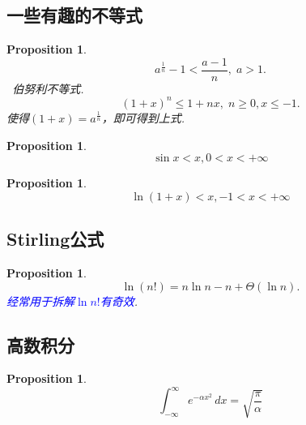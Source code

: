 \documentclass{article}
\newtheorem{proposition}[theorem]{Proposition}
\newcommand{\hints}{{\color{blue} \text{hints}}}
\newcommand{\bluet}[1]{\textcolor{blue}{#1}}
\begin{document}
\subsection{一些有趣的不等式}

\begin{proposition}\label{prop: bonuli}
$$
a^{\frac{1}{n}}-1 < \frac{a-1}{n},\; a > 1.
$$
\hints\ {\color{red}伯努利不等式}.
$$
(1+x)^n \leq 1 + nx, \; n \geq 0, x \leq -1.
$$
使得$(1+x) = a^{\frac{1}{n}}$，即可得到上式.
\end{proposition}

\begin{proposition}
\rm 
$$
\sin x < x , 0 < x < +\infty
$$
\end{proposition}

\begin{proposition}
\rm 
$$
\ln(1+x) < x,  -1< x < +\infty
$$
\end{proposition}

\subsection{Stirling公式}

\begin{proposition}
\rm 
$$
\ln(n!) = n\ln n-n+\Theta(\ln n). 
$$
\bluet{经常用于拆解$\ln n!$有奇效}. 
\end{proposition}


\subsection{高数积分}

\begin{proposition}
\rm 
$$
\int _{-\infty }^{\infty }e^{-\alpha x^{2}}\,dx={\sqrt {\frac {\pi }{\alpha }}}
$$
\end{proposition}
\end{document}
